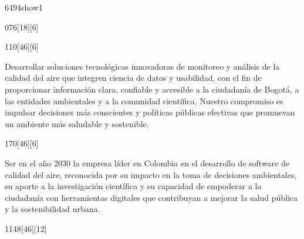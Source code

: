 \begin{NuevaPagina}{64}{94}{show1}
	\CabeceraDePoster{\MATERIA} 
	\begin{NuevoParrafo}{0}{76}[18][6]
		\begin{Marco}[\LineaSupC][\LineaInfC][\LineaIzqC][\LineaDerC][CBlanco]
		\end{Marco}
	\end{NuevoParrafo} 
	\CiudadFechaVolumen
	\begin{NuevoParrafo}{11}{0}[46][6]
		\begin{Marco}[\LineaSupC][\LineaInfC][\LineaIzqC][\LineaDerC][CBlanco]
			\begin{MisionVision}[Misión]
				{Desarrollar soluciones tecnológicas innovadoras de monitoreo y análisis de la calidad del aire que integren ciencia de datos y usabilidad, con el fin de proporcionar información clara, confiable y accesible a la ciudadanía de Bogotá, a las entidades ambientales y a la comunidad científica. Nuestro compromiso es impulsar decisiones más conscientes y políticas públicas efectivas que promuevan un ambiente más saludable y sostenible.}
			\end{MisionVision}			
		\end{Marco}
	\end{NuevoParrafo}
	\begin{NuevoParrafo}{17}{0}[46][6]
		\begin{Marco}[\LineaSupC][\LineaInfC][\LineaIzqC][\LineaDerC][CBlanco]
			\begin{MisionVision}[Visión]
				{Ser en el año 2030 la empresa líder en Colombia en el desarrollo de software de calidad del aire, reconocida por su impacto en la toma de decisiones ambientales, su aporte a la investigación científica y su capacidad de empoderar a la ciudadanía con herramientas digitales que contribuyan a mejorar la salud pública y la sostenibilidad urbana.}
			\end{MisionVision}
		\end{Marco}
	\end{NuevoParrafo}
		\begin{NuevoParrafo}{11}{48}[46][12]

\end{NuevoParrafo}
\end{NuevaPagina}
